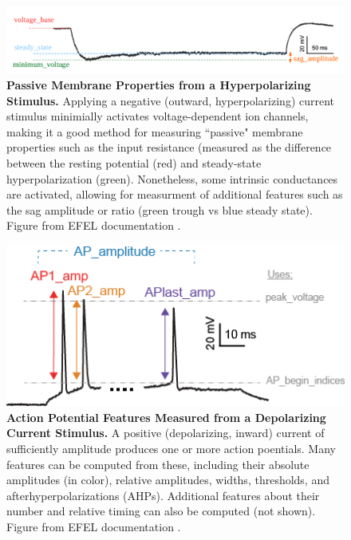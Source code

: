 \begin{figure}
\begin{center}
\includegraphics{figures/sag_amplitude}
\end{center}
\caption[Passive Membrane Properties Measured from a Hyperpolarizing Current Stimulus]{\textbf{Passive Membrane Properties from a Hyperpolarizing Stimulus.} Applying a negative (outward, hyperpolarizing) current stimulus minimially activates voltage-dependent ion channels, making it a good method for measuring ``passive" membrane properties such as the input resistance (measured as the difference between the resting potential (red) and steady-state hyperpolarization (green).
Nonetheless, some intrinsic conductances are activated, allowing for measurment of additional features such as the sag amplitude or ratio (green trough vs blue steady state). Figure from EFEL documentation \citep{efel-docs}.}
\label{fig:voltage_figures}
\end{figure}

\begin{figure}
\centering
\includegraphics{figures/AP_Amplitude.png}
\caption[Action Potential Features Measured from a Depolarizing Current Stimulus]{\textbf{Action Potential Features Measured from a Depolarizing Current Stimulus.} A positive (depolarizing, inward) current of sufficiently amplitude produces one or more action poentials.
Many features can be computed from these, including their absolute amplitudes (in color), relative amplitudes, widths, thresholds, and afterhyperpolarizations (AHPs).
Additional features about their number and relative timing can also be computed (not shown).
Figure from EFEL documentation \citep{efel_documentation}.}
\label{fig:features_example}
\end{figure}



